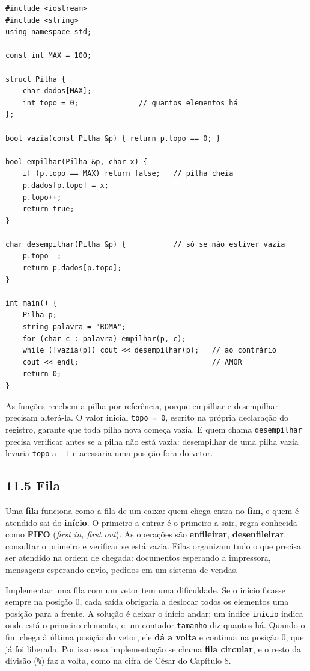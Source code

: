 \begin{codigo}
\begin{Verbatim}[breaklines=true, breaksymbolleft={}, fontsize=\footnotesize]
#include <iostream>
#include <string>
using namespace std;

const int MAX = 100;

struct Pilha {
    char dados[MAX];
    int topo = 0;              // quantos elementos há
};

bool vazia(const Pilha &p) { return p.topo == 0; }

bool empilhar(Pilha &p, char x) {
    if (p.topo == MAX) return false;   // pilha cheia
    p.dados[p.topo] = x;
    p.topo++;
    return true;
}

char desempilhar(Pilha &p) {           // só se não estiver vazia
    p.topo--;
    return p.dados[p.topo];
}

int main() {
    Pilha p;
    string palavra = "ROMA";
    for (char c : palavra) empilhar(p, c);
    while (!vazia(p)) cout << desempilhar(p);   // ao contrário
    cout << endl;                               // AMOR
    return 0;
}
\end{Verbatim}
\end{codigo}

As funções recebem a pilha por referência, porque empilhar e desempilhar precisam alterá-la. O valor inicial \texttt{topo = 0}, escrito na própria declaração do registro, garante que toda pilha nova começa vazia. E quem chama \texttt{desempilhar} precisa verificar antes se a pilha não está vazia: desempilhar de uma pilha vazia levaria \texttt{topo} a $-1$ e acessaria uma posição fora do vetor.

\subsection{11.5 Fila}

Uma \textbf{fila} funciona como a fila de um caixa: quem chega entra no \textbf{fim}, e quem é atendido sai do \textbf{início}. O primeiro a entrar é o primeiro a sair, regra conhecida como \textbf{FIFO} (\textit{first in, first out}). As operações são \textbf{enfileirar}, \textbf{desenfileirar}, consultar o primeiro e verificar se está vazia. Filas organizam tudo o que precisa ser atendido na ordem de chegada: documentos esperando a impressora, mensagens esperando envio, pedidos em um sistema de vendas.

Implementar uma fila com um vetor tem uma dificuldade. Se o início ficasse sempre na posição 0, cada saída obrigaria a deslocar todos os elementos uma posição para a frente. A solução é deixar o início andar: um índice \texttt{inicio} indica onde está o primeiro elemento, e um contador \texttt{tamanho} diz quantos há. Quando o fim chega à última posição do vetor, ele \textbf{dá a volta} e continua na posição 0, que já foi liberada. Por isso essa implementação se chama \textbf{fila circular}, e o resto da divisão (\texttt{\%}) faz a volta, como na cifra de César do Capítulo 8.

